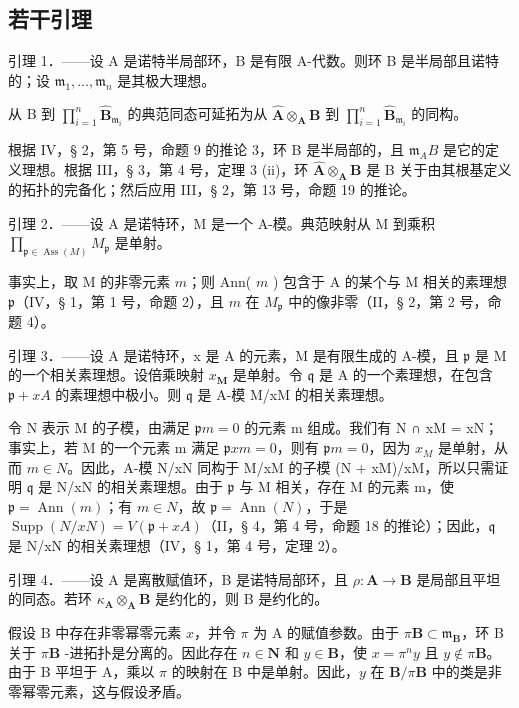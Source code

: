\subsection{若干引理}

引理 1．——设 A 是诺特半局部环，B 是有限 A-代数。则环 B 是半局部且诺特的；设 \(\mathfrak{m}_1, \ldots, \mathfrak{m}_n\) 是其极大理想。

从 B 到 \(\prod_{i=1}^{n} \hat{\mathbf{B}}_{\mathfrak{m}_i}\) 的典范同态可延拓为从 \(\hat{\mathbf{A}} \otimes_{\mathbf{A}} \mathbf{B}\) 到 \(\prod_{i=1}^{n} \hat{\mathbf{B}}_{\mathfrak{m}_i}\) 的同构。

根据 IV，§ 2，第 5 号，命题 9 的推论 3，环 B 是半局部的，且 \(\mathfrak{m}_{A}B\) 是它的定义理想。根据 III，§ 3，第 4 号，定理 3 (ii)，环 \(\hat{\mathbf{A}} \otimes_{\mathbf{A}} \mathbf{B}\) 是 B 关于由其根基定义的拓扑的完备化；然后应用 III，§ 2，第 13 号，命题 19 的推论。

引理 2．——设 A 是诺特环，M 是一个 A-模。典范映射从 M 到乘积 \(\prod_{\mathfrak{p} \in \operatorname{Ass}(M)} M_{\mathfrak{p}}\) 是单射。

事实上，取 M 的非零元素 \(m\)；则 Ann( \(m\) ) 包含于 A 的某个与 M 相关的素理想 \(\mathfrak{p}\)（IV，§ 1，第 1 号，命题 2），且 \(m\) 在 \(M_{\mathfrak{p}}\) 中的像非零（II，§ 2，第 2 号，命题 4）。

引理 3．——设 A 是诺特环，x 是 A 的元素，M 是有限生成的 A-模，且 \(\mathfrak{p}\) 是 M 的一个相关素理想。设倍乘映射 \(x_{\mathbf{M}}\) 是单射。令 \(\mathfrak{q}\) 是 A 的一个素理想，在包含 \(\mathfrak{p} + xA\) 的素理想中极小。则 \(\mathfrak{q}\) 是 A-模 M/xM 的相关素理想。

令 N 表示 M 的子模，由满足 \(\mathfrak{p}m = 0\) 的元素 m 组成。我们有 N ∩ xM = xN；事实上，若 M 的一个元素 m 满足 \(\mathfrak{p}xm = 0\)，则有 \(\mathfrak{p}m = 0\)，因为 \(x_{M}\) 是单射，从而 \(m \in N\)。因此，A-模 N/xN 同构于 M/xM 的子模 (N + xM)/xM，所以只需证明 \(\mathfrak{q}\) 是 N/xN 的相关素理想。由于 \(\mathfrak{p}\) 与 M 相关，存在 M 的元素 m，使 \(\mathfrak{p} = \operatorname{Ann}(m)\)；有 \(m \in N\)，故 \(\mathfrak{p} = \operatorname{Ann}(N)\)，于是 \(\operatorname{Supp}(N/xN) = V(\mathfrak{p} + xA)\)（II，§ 4，第 4 号，命题 18 的推论）；因此，\(\mathfrak{q}\) 是 N/xN 的相关素理想（IV，§ 1，第 4 号，定理 2）。

引理 4．——设 A 是离散赋值环，B 是诺特局部环，且 \(\rho: \mathbf{A} \to \mathbf{B}\) 是局部且平坦的同态。若环 \(\kappa_{\mathbf{A}} \otimes_{\mathbf{A}} \mathbf{B}\) 是约化的，则 B 是约化的。

假设 B 中存在非零幂零元素 \(x\)，并令 \(\pi\) 为 A 的赋值参数。由于 \(\pi \mathbf{B} \subset \mathfrak{m}_{\mathbf{B}}\)，环 B 关于 \(\pi \mathbf{B}\) -进拓扑是分离的。因此存在 \(n \in \mathbf{N}\) 和 \(y \in \mathbf{B}\)，使 \(x = \pi^n y\) 且 \(y \notin \pi \mathbf{B}\)。由于 B 平坦于 A，乘以 \(\pi\) 的映射在 B 中是单射。因此，\(y\) 在 \(\mathbf{B}/\pi \mathbf{B}\) 中的类是非零幂零元素，这与假设矛盾。
\relax{}
